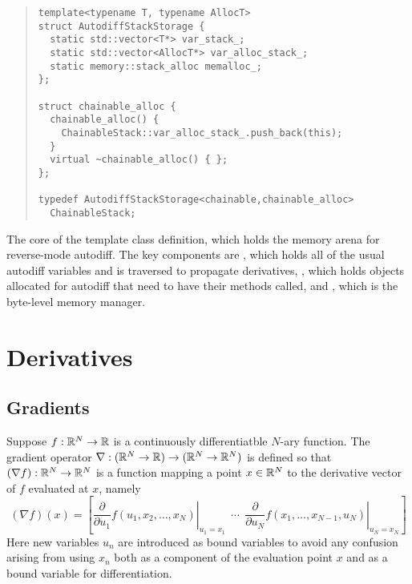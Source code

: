 \documentclass[10pt]{article}
\begin{document}
\begin{quote}
\begin{Verbatim}
template<typename T, typename AllocT>
struct AutodiffStackStorage {
  static std::vector<T*> var_stack_;
  static std::vector<AllocT*> var_alloc_stack_;
  static memory::stack_alloc memalloc_;
};

struct chainable_alloc {
  chainable_alloc() {
    ChainableStack::var_alloc_stack_.push_back(this);
  }
  virtual ~chainable_alloc() { };
};

typedef AutodiffStackStorage<chainable,chainable_alloc>
  ChainableStack;
\end{Verbatim}
\end{quote}
%
The core of the  template class
definition, which holds the memory arena for reverse-mode autodiff.
The key components are , which holds all of the
usual autodiff variables and is traversed to propagate derivatives,
, which holds objects allocated for autodiff
that need to have their  methods called, and
, which is the byte-level memory
manager.














\clearpage
\appendix

\section{Derivatives}\label{derivative-definitions.section}

\subsection{Gradients}

Suppose $f : \mathbb{R}^N \rightarrow \mathbb{R}$ is a continuously
differentiatble $N$-ary function.  The gradient operator
$\nabla:(\mathbb{R}^N \rightarrow \mathbb{R})\rightarrow (\mathbb{R}^N \rightarrow
\mathbb{R}^N)$ is defined so that $(\nabla f):\mathbb{R}^N \rightarrow
\mathbb{R}^N$ is a function mapping a point $x \in \mathbb{R}^N$ to the
derivative vector of $f$ evaluated at $x$, namely
%
\[
(\nabla f)(x) 
= 
\left[
  \left. 
    \frac{\partial}{\partial u_1} f(u_1,x_2,\ldots,x_N)
  \right|_{u_1 = x_1}
  \ \ \cdots \ \ 
  \left. 
    \frac{\partial}{\partial u_N}  f(x_1,\ldots,x_{N-1},u_N)
   \right|_{u_N = x_N}
\right]
\]
%
Here new variables $u_n$ are introduced as bound variables to
avoid any confusion arising from using $x_n$ both as a component of
the evaluation point $x$ and as a bound variable for differentiation.
\end{document}
